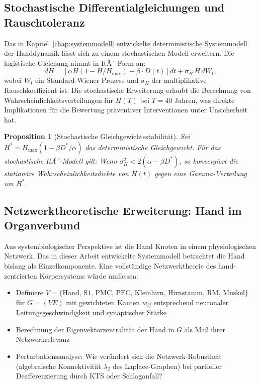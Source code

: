 ﻿\documentclass[12pt,a4paper]{report}
\theoremstyle{plain}
\newtheorem{proposition}[theorem]{Proposition}
\theoremstyle{definition}
\theoremstyle{remark}
\begin{document}
\subsection{Stochastische Differentialgleichungen und Rauschtoleranz}

Das in Kapitel~\ref{chap:systemmodell} entwickelte deterministische
Systemmodell der Handdynamik lässt sich zu einem stochastischen
Modell erweitern. Die logistische Gleichung nimmt in ItÃ´-Form an:
\begin{equation}
  dH = \left[\alpha H(1 - H/H_{\max}) - \beta \cdot D(t)\right] dt
  + \sigma_H \, H \, dW_t,
\end{equation}
wobei $W_t$ ein Standard-Wiener-Prozess und $\sigma_H$ der
multiplikative Rauschkoeffizient ist. Die stochastische Erweiterung
erlaubt die Berechnung von Wahrscheinlichkeitsverteilungen für $H(T)$
bei $T = 40$ Jahren, was direkte Implikationen für die Bewertung
präventiver Interventionen unter Unsicherheit hat.

\begin{proposition}[Stochastische Gleichgewichtsstabilität]
Sei $H^* = H_{\max}(1 - \beta D^*/\alpha)$ das deterministische
Gleichgewicht. Für das stochastische ItÃ´-Modell gilt: Wenn
$\sigma_H^2 < 2(\alpha - \beta D^*)$, so konvergiert die
stationäre Wahrscheinlichkeitsdichte von $H(t)$ gegen eine
Gamma-Verteilung um $H^*$.
\end{proposition}

\subsection{Netzwerktheoretische Erweiterung: Hand im Organverbund}

Aus systembiologischer Perspektive ist die Hand Knoten in einem
physiologischen Netzwerk. Das in dieser Arbeit entwickelte Systemmodell
betrachtet die Hand bislang als Einzelkomponente. Eine vollständige
Netzwerktheorie des hand-zentrierten Körpersystems würde umfassen:

\begin{itemize}
\item Definiere $V = \{\text{Hand, S1, PMC, PFC, Kleinhirn, Hirnstamm, RM, Muskel}\}$ für $G = (V E)$ mit gewichteten Kanten $w_{ij}$ entsprechend neuronaler
  Leitungsgeschwindigkeit und synaptischer Stärke
\item Berechnung der Eigenvektorzentralität der Hand in $G$ als
  Maß ihrer Netzwerkrelevanz
\item Perturbationsanalyse: Wie verändert sich die Netzwerk-Robustheit
  (algebraische Konnektivität $\lambda_2$ des Laplace-Graphen) bei
  partieller Deafferenzierung durch KTS oder Schlaganfall?
\end{itemize}
\end{document}
